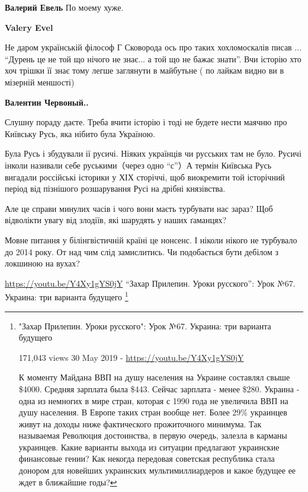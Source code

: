 \begin{itemize}
\begin{itemize}
\textbf{Валерий Евель} По моему хуже.

\textbf{Valery Evel} 

Не даром українській філософ Г Сковорода ось про таких
хохломоскалів писав ... \enquote{Дурень це не той що нічого не знає... а той що не бажає
знати}. Вчи історію хто хоч трішки її знає тому легше заглянути в майбутьне (
по лайкам видно ви в мізерній меншості)

\textbf{Валентин Червоный..}

Слушну пораду даєте. Треба вчити історію і тоді не будете нести маячню про
Київську Русь, яка нібито була Україною.

Була Русь і збудували ії русичі. Ніяких українців чи русських там не було.
Русичі інколи називали себе руськими（через одно \enquote{с}）А термін Київська Русь
вигадали россійські історики у ХІХ сторіччі, щоб виокремити той історічний
період від пізнішого розшарування Русі на дрібні князівства.

Але це справи минулих часів і чого вони маєть турбувати нас зараз? Щоб відволікти увагу від злодіїв, які шарудять у наших ґаманцях?

Мовне питання у білінгвістичній країні це нонсенс. І ніколи нікого не турбувало
до 2014 року. От над чим слід замислитись. Чи подобається бути
дебілом з локшиною на вухах?

\url{https://youtu.be/Y4Xy1gYS0jY}
\enquote{Захар Прилепин. Уроки русского}: Урок №67. Украина: три варианта будущего
\footnote{
"Захар Прилепин. Уроки русского": Урок №67. Украина: три варианта будущего

171,043 views 30 May 2019 - \url{https://youtu.be/Y4Xy1gYS0jY}

К моменту Майдана ВВП на душу населения на Украине составлял свыше \$4000.
Средняя зарплата была \$443. Сейчас зарплата - менее \$280.
Украина - одна из немногих в мире стран, которая с 1990 года не
увеличила ВВП на душу населения. В Европе таких стран вообще
нет. Более 29\% украинцев живут на доходы ниже фактического
прожиточного минимума. Так называемая Революция достоинства, в
первую очередь, залезла в карманы украинцев. Какие варианты
выхода из ситуации предлагают украинские финансовые гении? Как
некогда передовая советская республика стала донором для
новейших украинских мультимиллиардеров и какое будущее ее ждет
в ближайшие годы?
}


\end{itemize}
\end{itemize}
